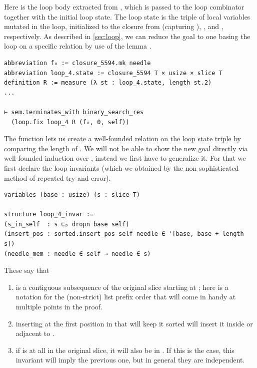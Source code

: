 Here  is the loop body extracted from ,
which is passed to the loop combinator  together with the initial
loop state. The loop state is the triple  of local variables
mutated in the loop, initialized to the closure from 
(capturing ), , and , respectively. As described
in \autoref{sec:loop}, we can reduce the goal to one basing the loop on a
specific relation by use of the lemma .

\begin{verbatim}
abbreviation f₀ := closure_5594.mk needle
abbreviation loop_4.state := closure_5594 T × usize × slice T
definition R := measure (λ st : loop_4.state, length st.2)
...

⊢ sem.terminates_with binary_search_res
  (loop.fix loop_4 R (f₀, 0, self))
\end{verbatim}

The  function lets us create a well-founded relation on the loop state triple
by comparing the length of . We will not be able to show the new goal
directly via well-founded induction over , instead we first have to
generalize it. For that we first declare the loop invariants (which we obtained by
the non-sophisticated method of repeated try-and-error).

\begin{verbatim}
variables (base : usize) (s : slice T)

structure loop_4_invar :=
(s_in_self  : s ⊑ₚ dropn base self)
(insert_pos : sorted.insert_pos self needle ∈ '[base, base + length s])
(needle_mem : needle ∈ self → needle ∈ s)
\end{verbatim}

These say that
\begin{enumerate}
\item {} is a contiguous subsequence of the original slice  starting at ; here  is a
  notation for the (non-strict) list prefix order that will come in handy at multiple points
  in the proof.
\item inserting  at the first position in  that will
  keep it sorted will insert it inside or adjacent to .
\item if  is at all in the original slice, it will also be in
  . If this is the case, this invariant will imply the previous one, but in
  general they are independent.
\end{enumerate}


